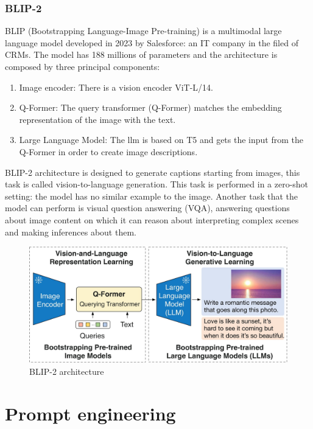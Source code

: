 \subsubsection{BLIP-2}
BLIP (Bootstrapping Language-Image Pre-training) is a multimodal large language model developed in 2023 by Salesforce: an IT company in the filed of CRMs.
The model has 188 millions of parameters and the architecture is composed by three principal components:
\begin{enumerate}
    \item Image encoder: There is a vision encoder ViT-L/14.

    \item Q-Former: The query transformer (Q-Former) matches the embedding representation of the image with the text.

    \item Large Language Model: The llm is based on T5 and gets the input from the Q-Former in order to create image descriptions.
\end{enumerate}
BLIP-2 architecture is designed to generate captions starting from images, this task is called vision-to-language generation. This task is performed in a zero-shot setting: the model has no similar example to the image. Another task that the model can perform is visual question answering (VQA), answering questions about image content on which it can reason about interpreting complex scenes and making inferences about them. 
\begin{figure}[H]
    \centering
    \includegraphics[width=0.7\linewidth]{Figures/fig_24.jpg}
    \caption{BLIP-2 architecture}
    \label{fig:enter-label}
\end{figure}
\newpage
\section{Prompt engineering}
